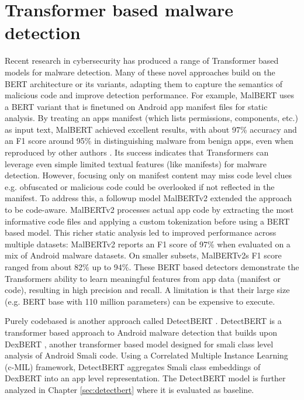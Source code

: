 \section{Transformer based malware detection}

Recent research in cybersecurity has produced a range of Transformer based models for malware detection.
Many of these novel approaches build on the BERT 
\cite{bert} 
architecture or its variants, 
adapting them to capture the semantics of malicious code and improve detection performance. 
For example, MalBERT 
\cite{malbert}
uses a BERT variant that is finetuned on Android app manifest files for static analysis. 
By treating an apps manifest (which lists permissions, components, etc.) as input text, 
MalBERT achieved excellent results, with about 97\% accuracy and an F1 score around 95\% 
in distinguishing malware from benign apps, even when reproduced by other authors 
\cite{malbert_reproduce}. 
Its success indicates that Transformers can leverage even simple limited textual features (like manifests) 
for malware detection. 
However, focusing only on manifest content may miss code level clues e.g. 
obfuscated or malicious code could be overlooked if not reflected in the manifest. 
To address this, a followup model MalBERTv2 
\cite{malbert_two} 
extended the approach to be code-aware. 
MalBERTv2 processes actual app code by extracting the most informative code files and applying a 
custom tokenization before using a BERT based model.
This richer static analysis led to improved performance across multiple datasets: 
MalBERTv2 reports an F1 score of 97\% when evaluated on a mix of Android malware datasets.
On smaller subsets, MalBERTv2s F1 score ranged from about 82\% up to 94\%. 
These BERT based detectors demonstrate the Transformers ability to learn meaningful features from 
app data (manifest or code), resulting in high precision and recall. 
A limitation is that their large size (e.g. BERT base with 110 million parameters) can be expensive to execute. 

Purely codebased is another approach called DetectBERT \cite{detectbert}.
DetectBERT is a transformer based approach to Android malware detection that 
builds upon DexBERT \cite{dexbert}, 
another transformer based model designed for smali class level analysis of Android Smali code.
Using a Correlated Multiple Instance Learning (c-MIL) framework, 
DetectBERT aggregates Smali class embeddings of DexBERT into an app level representation.
The DetectBERT model is further analyzed in Chapter \ref{sec:detectbert} where it is evaluated as baseline.

